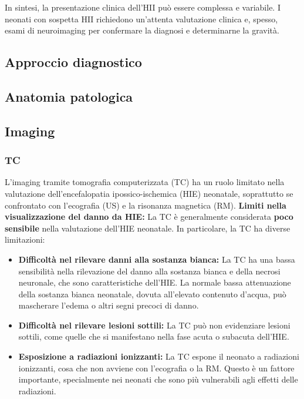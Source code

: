 In sintesi, la presentazione clinica dell'HII può essere complessa e variabile. I neonati con sospetta HII richiedono un'attenta valutazione clinica e, spesso, esami di neuroimaging per confermare la diagnosi e determinarne la gravità.

\subsection{Approccio diagnostico}

\subsection{Anatomia patologica}

\subsection{Imaging}

\subsubsection{TC}

L'imaging tramite tomografia computerizzata (TC) ha un ruolo limitato nella valutazione dell'encefalopatia ipossico-ischemica (HIE) neonatale, soprattutto se confrontato con l'ecografia (US) e la risonanza magnetica (RM).
\textbf{Limiti nella visualizzazione del danno da HIE:} La TC è generalmente considerata \textbf{poco sensibile} nella valutazione dell'HIE neonatale. In particolare, la TC ha diverse limitazioni:

\begin{itemize}
	\tightlist
	\item
	\textbf{Difficoltà nel rilevare danni alla sostanza bianca:} La TC ha una bassa sensibilità nella rilevazione del danno alla sostanza bianca e della necrosi neuronale, che sono caratteristiche dell'HIE. La normale bassa attenuazione della sostanza bianca neonatale, dovuta all'elevato contenuto d'acqua, può mascherare l'edema o altri segni precoci di danno.
	\item
	\textbf{Difficoltà nel rilevare lesioni sottili:} La TC può non evidenziare lesioni sottili, come quelle che si manifestano nella fase acuta o subacuta dell'HIE.
	\item
	\textbf{Esposizione a radiazioni ionizzanti:} La TC espone il neonato a radiazioni ionizzanti, cosa che non avviene con l'ecografia o la RM. Questo è un fattore importante, specialmente nei neonati che sono più vulnerabili agli effetti delle radiazioni.
\end{itemize}

